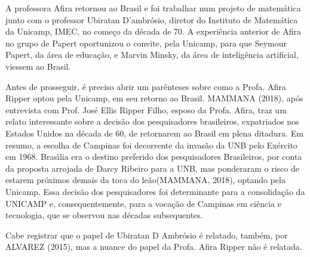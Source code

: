 \documentclass[
12pt,		%
openright,	%
twoside,  %
a4paper,			%
chapter=TITLE,		%
english,			%
french,				%
spanish,			%
brazil				%
]{USPSC-classe/USPSC}
\begin{document}
A professora Afira retornou ao Brasil e foi trabalhar num projeto de matem\'atica junto com o professor Ubiratan D’ambr\'osio, diretor do Instituto de Matem\'atica da Unicamp, IMEC, no come\c{c}o da d\'ecada de 70. A experi\^encia anterior de Afira no grupo de Papert oportunizou o convite, pela Unicamp, para que Seymour Papert, da \'area de educa\c{c}\~ao, e Marvin Minsky, da \'area de intelig\^encia artificial, viessem ao Brasil.

















Antes de prosseguir, \'e preciso abrir um par\^enteses sobre como a Profa. Afira Ripper optou pela Unicamp, em seu retorno ao Brasil.  MAMMANA (2018), ap\'os entrevista com Prof. Jos\'e Ellis Ripper Filho, esposo da Profa. Afira, traz um relato interessante sobre a decis\~ao dos pesquisadores brasileiros, expatriados nos Estados Unidos na d\'ecada de 60, de retornarem ao Brasil em plena ditadura. Em resumo, a escolha de Campinas foi decorrente da invas\~ao da UNB pelo Ex\'ercito em 1968. Bras\'{\i}lia era o destino preferido dos pesquisadores Brasileiros, por conta da proposta arrojada de Darcy Ribeiro para a UNB, mas ponderaram o risco de estarem pr\'oximos demais da \textquotedbl toca do le\~ao\textquotedbl   (MAMMANA, 2018), optando pela Unicamp. Essa decis\~ao dos pesquisadores foi determinante para a consolida\c{c}\~ao da UNICAMP e, consequentemente, para a voca\c{c}\~ao de Campinas em ci\^encia e tecnologia, que se observou nas d\'ecadas subsequentes.

















Cabe registrar que o papel de Ubiratan D Ambr\'osio \'e relatado, tamb\'em, por ALVAREZ (2015), mas a nuance do papel da Profa. Afira Ripper n\~ao \'e relatada.
\end{document}
